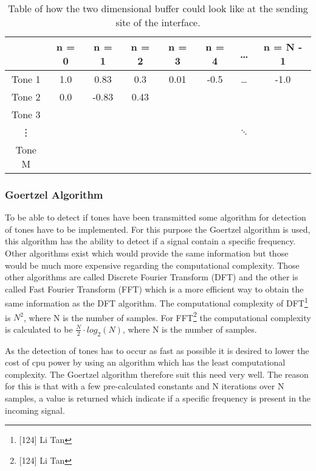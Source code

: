 		\begin{table}[htb]
			\begin{center}
				\begin{tabular}{c|c c c c c c c}
				 & n = 0 & n = 1 & n = 2 & n = 3 & n = 4 & \ldots & n = N - 1 \\
				\hline
				Tone 1 & 1.0 & 0.83 & 0.3 & 0.01 & -0.5 & \ldots & -1.0 \\
				Tone 2 & 0.0 & -0.83 & 0.43 & & & & \\
				Tone 3 &  &  &  &  &  &  & \\
				\vdots &  &  &  &  &  & $\ddots$ & \\
				Tone M &  &  &  &  &  &  & \\
				\end{tabular}
			\end{center}
			\caption{Table of how the two dimensional buffer could look like at the sending site of the interface.}
			\label{tab:2d_buffer}
		\end{table}
		
		\subsubsection{Goertzel Algorithm}
		To be able to detect if tones have been transmitted some algorithm for detection of tones have to be implemented.
		For this purpose the Goertzel algorithm is used, this algorithm has the ability to detect if a signal contain a
		specific frequency. Other algorithms exist which would provide the same information but those would be
		much more expensive regarding the computational complexity. Those other algorithms are called Discrete Fourier Transform (DFT)
		and the other is called Fast Fourier Transform (FFT) which is a more efficient way to obtain the same information
		as the DFT algorithm. The computational complexity of DFT\footnote{[124] Li Tan} is $N^2$, where N is the number of samples.
		For FFT\footnote{[124] Li Tan} the computational complexity is calculated to be $\frac{N}{2}\cdot log_{2}(N)$,
		where N is the number of samples.
		
		As the detection of tones has to occur as fast as possible it is desired to lower the cost of cpu power by using 
		an algorithm which has the least computational complexity. The Goertzel algorithm therefore suit this need very well.
		The reason for this is that with a few pre-calculated constants and N iterations over N samples, a value is returned
		which indicate if a specific frequency is present in the incoming signal.
		
